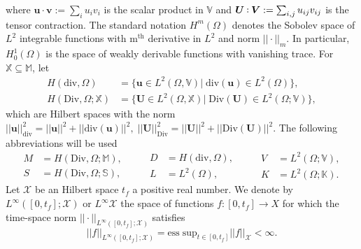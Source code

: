 \documentclass{ifacconf}
\def\onedot{$\mathsurround0pt\ldotp$}
\def\cddot{%
	\mathbin{\vcenter{\baselineskip.67ex
			\hbox{\onedot}\hbox{\onedot}}%
}}
\begin{document}
where $\bm{u} \cdot \bm{v} := \sum_{i} u_{i} v_{i}$ is the scalar product in $\mathbb{V}$ and $\bm{U} \cddot \bm{V} := \sum_{i,j} u_{ij} v_{ij}$ is the tensor contraction. The standard notation $H^m(\Omega)$ denotes the Sobolev space of $L^2$ integrable functions with  m$^\text{th}$ derivative in $L^2$ and norm $||\cdot||_m$. In particular, $H^1_0(\Omega)$ is the space of weakly derivable functions with vanishing trace. For $\mathbb{X} \subseteq \mathbb{M}$, let
\begin{equation*}
\begin{aligned}
H(\mathrm{div}, \Omega) &= \{\bm{u} \in L^2(\Omega, \mathbb{V}) \vert \; \mathrm{div}(\bm{u}) \in L^2(\Omega) \}, \\
H(\mathrm{Div}, \Omega; \mathbb{X}) &= \{\bm{U} \in L^2(\Omega, \mathbb{X}) \vert \; \mathrm{Div}(\bm{U}) \in L^2(\Omega; \mathbb{V}) \},
\end{aligned}
\end{equation*}
which are Hilbert spaces with the norm $||\bm{u}||^2_{\text{div}} = ||\bm{u}||^2 + ||\mathrm{div}(\bm{u})||^2, \; ||\bm{U}||^2_{\text{Div}} = ||\bm{U}||^2 + ||\mathrm{Div}(\bm{U})||^2$. The following abbreviations will be used
\begin{equation*}
\begin{aligned}
M &= H(\mathrm{Div}, \Omega; \mathbb{M}), \\
S &= H(\mathrm{Div}, \Omega; \mathbb{S}),
\end{aligned} \qquad
\begin{aligned}
D &= H(\mathrm{div}, \Omega), \\
L &= L^2(\Omega),
\end{aligned} \qquad
\begin{aligned}
V &= L^2(\Omega; \mathbb{V}), \\
K &= L^2(\Omega; \mathbb{K}).
\end{aligned}
\end{equation*}
Let $\mathcal{X}$ be an Hilbert space $t_f$ a positive real number. We denote by $L^\infty([0, t_f]; \mathcal{X})$ or $L^\infty \mathcal{X}$ the space of functions $f: [0, t_f] \rightarrow X$ for which the time-space norm $||\cdot||_{L^\infty([0, t_f]; \mathcal{X})}$ satisfies
\[
||f||_{L^\infty([0, t_f]; \mathcal{X})} = \mathrm{ess \; sup}_{t \in [0,t_f]} ||f||_{\mathcal{X}} < \infty.
\]
\end{document}
